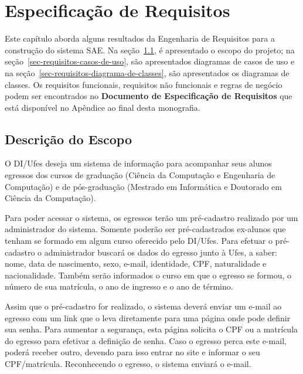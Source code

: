 
\chapter{Especificação de Requisitos}
\label{sec-unagi}

Este capítulo aborda alguns resultados da Engenharia de Requisitos para a construção do sistema SAE. Na seção~\ref{sec-requisitos-escopo}, é apresentado o escopo do projeto; na seção~\ref{sec-requisitos-casos-de-uso}, são apresentados diagramas de casos de uso e na seção~\ref{sec-requisitos-diagrama-de-classes}, são apresentados os diagramas de classes. Os requisitos funcionais, requisitos não funcionais e regras de negócio podem ser encontrados no \textbf{Documento de Especificação de Requisitos} que está disponível no Apêndice ao final desta monografia.


\section{Descrição do Escopo}
\label{sec-requisitos-escopo}

O DI/Ufes deseja um sistema de informação para acompanhar seus alunos egressos dos cursos de graduação (Ciência da Computação e Engenharia de Computação) e de pós-graduação (Mestrado em Informática e Doutorado em Ciência da Computação). 

Para poder acessar o sistema, os egressos terão um pré-cadastro realizado por um administrador do sistema. Somente poderão ser pré-cadastrados ex-alunos que tenham se formado em algum curso oferecido pelo DI/Ufes. Para efetuar o pré-cadastro o administrador buscará os dados do egresso junto à Ufes, a saber: nome, data de nascimento, sexo, e-mail, identidade, CPF, naturalidade e nacionalidade. Também serão informados o curso em que o egresso se formou, o número de sua matrícula, o ano de ingresso e o ano de término. 

Assim que o pré-cadastro for realizado, o sistema deverá enviar um e-mail ao egresso com um link que o leva diretamente para uma página onde pode definir sua senha. Para aumentar a segurança, esta página solicita o CPF ou a matrícula do egresso para efetivar a definição de senha. Caso o egresso perca este e-mail, poderá receber outro, devendo para isso entrar no site e informar o seu CPF/matrícula. Reconhecendo o egresso, o sistema enviará o e-mail.
 
